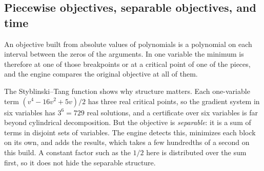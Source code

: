 \subsection{Piecewise objectives, separable objectives, and time}
\label{ssec:opt-exact-special}

An objective built from absolute values of polynomials is a polynomial on each
interval between the zeros of the  arguments. In one variable the
minimum is therefore at one of those breakpoints or at a critical point of one
of the pieces, and the engine compares the original objective at all of them.

\begin{codepairs}
\end{codepairs}

The Styblinski--Tang function shows why
structure matters. Each one-variable term \((v^4 - 16v^2 + 5v)/2\) has three real
critical points, so the gradient system in six variables has \(3^6 = 729\) real
solutions, and a certificate over six variables is far beyond cylindrical
decomposition. But the objective is
\emph{separable}: it is a sum of
terms in disjoint sets of variables. The engine detects this, minimizes each
block on its own, and adds the results, which takes a few hundredths of a
second on this build. A constant factor such as the \(1/2\) here is distributed
over the sum first, so it does not hide the separable structure.

